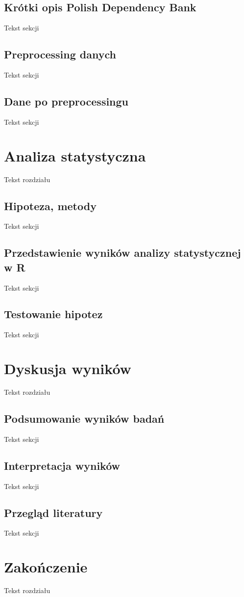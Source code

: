 \documentclass[licencjacka]{pracamgr_Kogni}
\begin{document}
\section{Krótki opis Polish Dependency Bank}
Tekst sekcji
\section{Preprocessing danych}
Tekst sekcji
\section{Dane po preprocessingu}
Tekst sekcji

\chapter{Analiza statystyczna}
Tekst rozdziału
\section{Hipoteza, metody}
Tekst sekcji
\section{Przedstawienie wyników analizy statystycznej w R}
Tekst sekcji
\section{Testowanie hipotez}
Tekst sekcji

\chapter{Dyskusja wyników}
Tekst rozdziału
\section{Podsumowanie wyników badań}
Tekst sekcji
\section{Interpretacja wyników}
Tekst sekcji
\section{Przegląd literatury}
Tekst sekcji

\chapter{Zakończenie}
Tekst rozdziału
\end{document}
